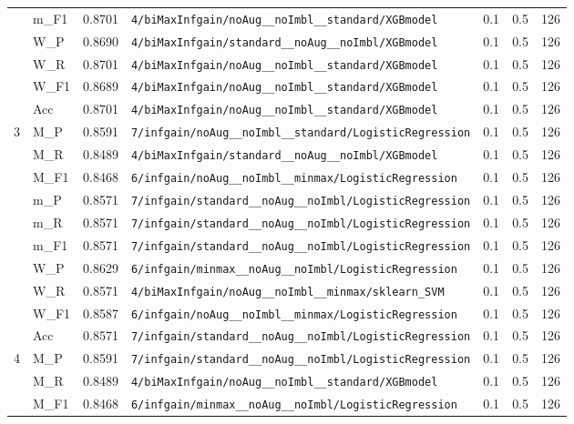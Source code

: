 \begin{table}[htbp]
\begin{tabular}{|c|l|c|>{\ttfamily\footnotesize}p{7.2cm}|c|c|c|}
 & m\_F1 & 0.8701 & \texttt{4/biMaxInfgain/noAug\_\_noImbl\_\_standard/XGBmodel} & 0.1 & 0.5  & 126 \\ 
 & W\_P & 0.8690 & \texttt{4/biMaxInfgain/standard\_\_noAug\_\_noImbl/XGBmodel} & 0.1 & 0.5  & 126 \\ 
 & W\_R & 0.8701 & \texttt{4/biMaxInfgain/noAug\_\_noImbl\_\_standard/XGBmodel} & 0.1 & 0.5  & 126 \\ 
 & W\_F1 & 0.8689 & \texttt{4/biMaxInfgain/noAug\_\_noImbl\_\_standard/XGBmodel} & 0.1 & 0.5  & 126 \\ 
 & Acc & 0.8701 & \texttt{4/biMaxInfgain/noAug\_\_noImbl\_\_standard/XGBmodel} & 0.1 & 0.5  & 126 \\ 
\hline
\multirow{10}{*}{3} & M\_P & 0.8591 & \texttt{7/infgain/noAug\_\_noImbl\_\_standard/LogisticRegression} & 0.1 & 0.5  & 126 \\ 
 & M\_R & 0.8489 & \texttt{4/biMaxInfgain/standard\_\_noAug\_\_noImbl/XGBmodel} & 0.1 & 0.5  & 126 \\ 
 & M\_F1 & 0.8468 & \texttt{6/infgain/noAug\_\_noImbl\_\_minmax/LogisticRegression} & 0.1 & 0.5  & 126 \\ 
 & m\_P & 0.8571 & \texttt{7/infgain/standard\_\_noAug\_\_noImbl/LogisticRegression} & 0.1 & 0.5  & 126 \\ 
 & m\_R & 0.8571 & \texttt{7/infgain/standard\_\_noAug\_\_noImbl/LogisticRegression} & 0.1 & 0.5  & 126 \\ 
 & m\_F1 & 0.8571 & \texttt{7/infgain/standard\_\_noAug\_\_noImbl/LogisticRegression} & 0.1 & 0.5  & 126 \\ 
 & W\_P & 0.8629 & \texttt{6/infgain/minmax\_\_noAug\_\_noImbl/LogisticRegression} & 0.1 & 0.5  & 126 \\ 
 & W\_R & 0.8571 & \texttt{4/biMaxInfgain/noAug\_\_noImbl\_\_minmax/sklearn\_SVM} & 0.1 & 0.5  & 126 \\ 
 & W\_F1 & 0.8587 & \texttt{6/infgain/noAug\_\_noImbl\_\_minmax/LogisticRegression} & 0.1 & 0.5  & 126 \\ 
 & Acc & 0.8571 & \texttt{7/infgain/standard\_\_noAug\_\_noImbl/LogisticRegression} & 0.1 & 0.5  & 126 \\ 
\hline
\multirow{10}{*}{4} & M\_P & 0.8591 & \texttt{7/infgain/standard\_\_noAug\_\_noImbl/LogisticRegression} & 0.1 & 0.5  & 126 \\ 
 & M\_R & 0.8489 & \texttt{4/biMaxInfgain/noAug\_\_noImbl\_\_standard/XGBmodel} & 0.1 & 0.5  & 126 \\ 
 & M\_F1 & 0.8468 & \texttt{6/infgain/minmax\_\_noAug\_\_noImbl/LogisticRegression} & 0.1 & 0.5  & 126 \\ 

\end{tabular}
\end{table}
